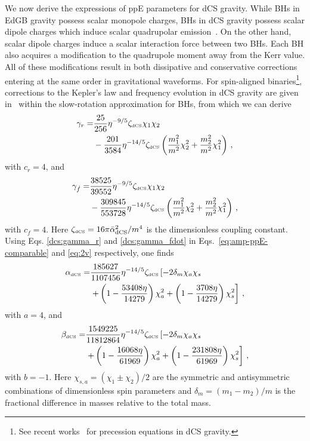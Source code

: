 \documentclass[prd,twocolumn,nofootinbib]{revtex4-1}
\newcommand{\DCS}{{\mbox{\tiny dCS}}}
\begin{document}
We now derive the expressions of ppE parameters for dCS gravity. While BHs in EdGB gravity possess scalar monopole charges, BHs in dCS gravity possess scalar dipole charges which induce scalar quadrupolar emission~\cite{Yagi:2011xp}. On the other hand, scalar dipole charges induce a scalar interaction force between two BHs. Each BH also acquires a modification to the quadrupole moment away from the Kerr value. All of these modifications result in both dissipative and conservative corrections entering at the same order in gravitational waveforms. For spin-aligned binaries\footnote{See recent works~\cite{Loutrel:2018rxs,Loutrel:2018ydv} for precession equations in dCS gravity.}, corrections to the Kepler's law and frequency evolution in dCS gravity are given in~\cite{Yagi:2012vf} within the slow-rotation approximation for BHs, from which we can derive
\begin{align}\label{dcs:gamma_r}
\gamma_r=&\frac{25}{256}\eta^{-9/5}\zeta_{\DCS}\chi_1 \chi_2 \nonumber \\ 
&-\frac{201}{3584}\eta^{-14/5}\zeta_{\DCS} \left(\frac{m_1^2}{m^2}\chi_2^2 +\frac{m_2^2}{m^2}\chi_1^2\right)\,,
\end{align}
with $c_r=4$, and
 \begin{align}\label{dcs:gamma_fdot}
\gamma_{\dot{f}}=& \frac{38525}{39552}\eta^{-9/5}\zeta_{\DCS}\chi_1 \chi_2 \nonumber \\
&-\frac{309845}{553728 }\eta^{-14/5}\zeta_{\DCS} \left(\frac{m_1^2}{m^2}\chi_2^2+\frac{m_2^2}{m^2}\chi_1^2\right)\,,
 \end{align}
with $c_{\dot{f}}=4$. Here $\zeta_{\DCS}=16\pi \bar{\alpha}_{\text{dCS}}^2/m^4$ is the dimensionless coupling constant.
Using Eqs. \eqref{dcs:gamma_r} and \eqref{dcs:gamma_fdot} in Eqs.~\eqref{eq:amp-ppE-comparable} and \eqref{eq:2v} respectively, one finds
 \begin{align}
 \alpha_{\DCS}=&\frac{185627}{1107456}\eta ^{-14/5}\zeta_{\DCS} \left[-2 \delta_m \chi_a \chi_s \right. \nonumber\\ 
 &\left. +\left(1-\frac{53408 \eta }{14279}\right) \chi_a^2+\left(1-\frac{3708 \eta }{14279}\right) \chi_s^2\right]\,,
 \end{align}
with $a=4$, and
 \begin{align}
 \beta_{\DCS}=&\frac{1549225}{11812864}\eta ^{-14/5} \zeta_{\DCS} \left[-2 \delta_m \chi_a \chi_s \right.\nonumber\\ 
 &\left. +\left(1-\frac{16068 \eta }{61969}\right)\chi_a^2 +\left(1-\frac{231808 \eta }{61969}\right)\chi_s^2\right]\,,
 \end{align}
with $b=-1$. Here $\chi_{s,a}=(\chi_1 \pm \chi_2 )/2$ are the symmetric and antisymmetric combinations of dimensionless spin parameters 
and $\delta_m=(m_1-m_2)/m$ is the fractional difference in masses relative to the total mass.
\end{document}
